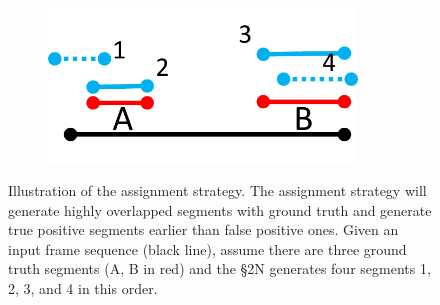 \documentclass[10pt,journal,compsoc]{IEEEtran}
\begin{document}
\begin{figure}[t]
\begin{subfigure}[b]{0.20\textwidth}
        \caption{\label{fig:HMLC_r1}}
   \end{subfigure}   
     \begin{subfigure}[b]{0.20\textwidth}
   	\includegraphics[width=0.9\textwidth]{figures/Matching/HMLC_r2.pdf}
        \caption{\label{fig:HMLC_r2}}
   \end{subfigure}  
   \caption{Illustration of the assignment strategy. The assignment strategy will generate highly overlapped segments with ground truth and generate true positive segments earlier than false positive ones. Given an input frame sequence (black line), assume there are three ground truth segments (A, B in red) and the \S2N generates four segments 1, 2, 3, and 4 in this order. \label{fig:HMLC-illurstration}}
\end{figure}   
\end{document}
